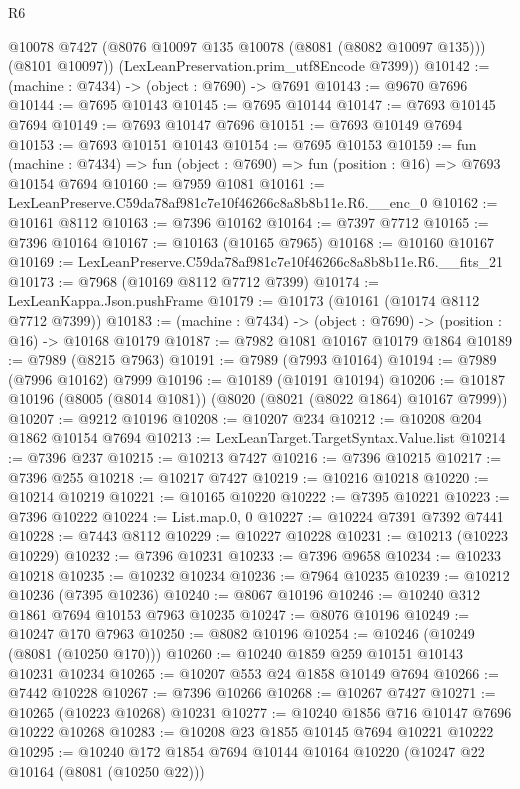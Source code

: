\begin{lexlean}{R6}
\begin{coremodule}
        @10078
        @7427
        (@8076 @10097 @135 @10078 (@8081 (@8082 @10097 @135)))
        (@8101 @10097))
      (LexLeanPreservation.prim_utf8Encode @7399))
@10142 := (machine : @7434) -> (object : @7690) -> @7691
@10143 := @9670 @7696
@10144 := @7695 @10143
@10145 := @7695 @10144
@10147 := @7693 @10145 @7694
@10149 := @7693 @10147 @7696
@10151 := @7693 @10149 @7694
@10153 := @7693 @10151 @10143
@10154 := @7695 @10153
@10159 := fun (machine : @7434) =>
  fun (object : @7690) => fun (position : @16) => @7693 @10154 @7694
@10160 := @7959 @1081
@10161 := LexLeanPreserve.C59da78af981c7e10f46266c8a8b8b11e.R6.__enc_0
@10162 := @10161 @8112
@10163 := @7396 @10162
@10164 := @7397 @7712
@10165 := @7396 @10164
@10167 := @10163 (@10165 @7965)
@10168 := @10160 @10167
@10169 := LexLeanPreserve.C59da78af981c7e10f46266c8a8b8b11e.R6.__fits_21
@10173 := @7968 (@10169 @8112 @7712 @7399)
@10174 := LexLeanKappa.Json.pushFrame
@10179 := @10173 (@10161 (@10174 @8112 @7712 @7399))
@10183 := (machine : @7434) -> (object : @7690) -> (position : @16) -> @10168 @10179
@10187 := @7982 @1081 @10167 @10179 @1864
@10189 := @7989 (@8215 @7963)
@10191 := @7989 (@7993 @10164)
@10194 := @7989 (@7996 @10162) @7999
@10196 := @10189 (@10191 @10194)
@10206 := @10187 @10196 (@8005 (@8014 @1081)) (@8020 (@8021 (@8022 @1864) @10167 @7999))
@10207 := @9212 @10196
@10208 := @10207 @234
@10212 := @10208 @204 @1862 @10154 @7694
@10213 := LexLeanTarget.TargetSyntax.Value.list
@10214 := @7396 @237
@10215 := @10213 @7427
@10216 := @7396 @10215
@10217 := @7396 @255
@10218 := @10217 @7427
@10219 := @10216 @10218
@10220 := @10214 @10219
@10221 := @10165 @10220
@10222 := @7395 @10221
@10223 := @7396 @10222
@10224 := List.map.{0, 0}
@10227 := @10224 @7391 @7392 @7441
@10228 := @7443 @8112
@10229 := @10227 @10228
@10231 := @10213 (@10223 @10229)
@10232 := @7396 @10231
@10233 := @7396 @9658
@10234 := @10233 @10218
@10235 := @10232 @10234
@10236 := @7964 @10235
@10239 := @10212 @10236 (@7395 @10236)
@10240 := @8067 @10196
@10246 := @10240 @312 @1861 @7694 @10153 @7963 @10235
@10247 := @8076 @10196
@10249 := @10247 @170 @7963
@10250 := @8082 @10196
@10254 := @10246 (@10249 (@8081 (@10250 @170)))
@10260 := @10240 @1859 @259 @10151 @10143 @10231 @10234
@10265 := @10207 @553 @24 @1858 @10149 @7694
@10266 := @7442 @10228
@10267 := @7396 @10266
@10268 := @10267 @7427
@10271 := @10265 (@10223 @10268) @10231
@10277 := @10240 @1856 @716 @10147 @7696 @10222 @10268
@10283 := @10208 @23 @1855 @10145 @7694 @10221 @10222
@10295 := @10240 @172 @1854 @7694 @10144 @10164 @10220 (@10247 @22 @10164 (@8081 (@10250 @22)))

\end{coremodule}
\end{lexlean}

